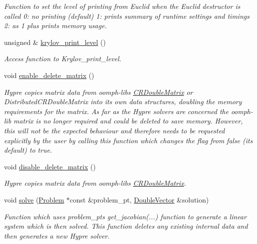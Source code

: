 \begin{DoxyCompactItemize}
\begin{DoxyCompactList}\small\item\em Function to set the level of printing from Euclid when the Euclid destructor is called 0\+: no printing (default) 1\+: prints summary of runtime settings and timings 2\+: as 1 plus prints memory usage. \end{DoxyCompactList}\item 
unsigned \& \hyperlink{classoomph_1_1HypreSolver_a4ed4bf0114bca132a31b8969c2a8fc00}{krylov\+\_\+print\+\_\+level} ()
\begin{DoxyCompactList}\small\item\em Access function to Krylov\+\_\+print\+\_\+level. \end{DoxyCompactList}\item 
void \hyperlink{classoomph_1_1HypreSolver_ae917113f255b23448210530b00f55338}{enable\+\_\+delete\+\_\+matrix} ()
\begin{DoxyCompactList}\small\item\em Hypre copies matrix data from oomph-\/lib\textquotesingle{}s \hyperlink{classoomph_1_1CRDoubleMatrix}{C\+R\+Double\+Matrix} or Distributed\+C\+R\+Double\+Matrix into its own data structures, doubling the memory requirements for the matrix. As far as the Hypre solvers are concerned the oomph-\/lib matrix is no longer required and could be deleted to save memory. However, this will not be the expected behaviour and therefore needs to be requested explicitly by the user by calling this function which changes the flag from false (its default) to true. \end{DoxyCompactList}\item 
void \hyperlink{classoomph_1_1HypreSolver_ae97158e3b4fca00cc15d0baa4c5444d4}{disable\+\_\+delete\+\_\+matrix} ()
\begin{DoxyCompactList}\small\item\em Hypre copies matrix data from oomph-\/lib\textquotesingle{}s \hyperlink{classoomph_1_1CRDoubleMatrix}{C\+R\+Double\+Matrix}. \end{DoxyCompactList}\item 
void \hyperlink{classoomph_1_1HypreSolver_a3a42a158a390f24d7d91ee78aa53e960}{solve} (\hyperlink{classoomph_1_1Problem}{Problem} $\ast$const \&problem\+\_\+pt, \hyperlink{classoomph_1_1DoubleVector}{Double\+Vector} \&solution)
\begin{DoxyCompactList}\small\item\em Function which uses problem\+\_\+pt\textquotesingle{}s get\+\_\+jacobian(...) function to generate a linear system which is then solved. This function deletes any existing internal data and then generates a new Hypre solver. \end{DoxyCompactList}\item 

\end{DoxyCompactItemize}
